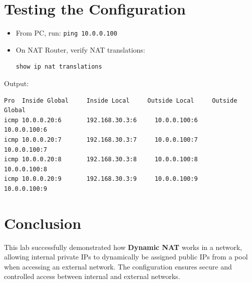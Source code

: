 \documentclass[a4paper,12pt]{article}
\begin{document}
\section*{Testing the Configuration}
\begin{itemize}
    \item From PC, run: \texttt{ping 10.0.0.100}
    \item On NAT Router, verify NAT translations:
\begin{lstlisting}[language=bash]
show ip nat translations
\end{lstlisting}
\end{itemize}

\noindent Output:
\begin{verbatim}
Pro  Inside Global     Inside Local     Outside Local     Outside Global
icmp 10.0.0.20:6       192.168.30.3:6     10.0.0.100:6       10.0.0.100:6
icmp 10.0.0.20:7       192.168.30.3:7     10.0.0.100:7       10.0.0.100:7
icmp 10.0.0.20:8       192.168.30.3:8     10.0.0.100:8       10.0.0.100:8
icmp 10.0.0.20:9       192.168.30.3:9     10.0.0.100:9       10.0.0.100:9
\end{verbatim}

\section*{Conclusion}
This lab successfully demonstrated how \textbf{Dynamic NAT} works in a network, allowing internal private IPs to dynamically be assigned public IPs from a pool when accessing an external network. The configuration ensures secure and controlled access between internal and external networks.
\end{document}
